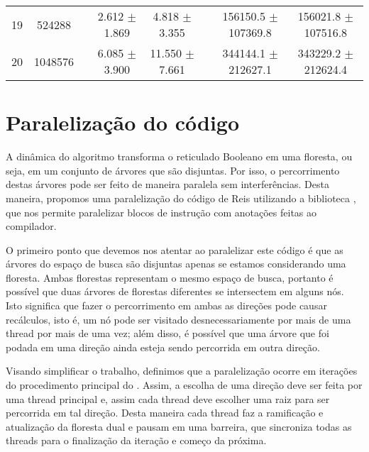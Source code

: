 \begin{table}
\begin{tabular}{cc c cc c cc}
19 &  524288 &&  2.612 $\pm$ 1.869 & 4.818 $\pm$ 3.355 &&  156150.5 $\pm$ 107369.8 & 156021.8 $\pm$ 107516.8 \\
20 & 1048576 &&  6.085 $\pm$ 3.900 & 11.550 $\pm$ 7.661 &&  344144.1 $\pm$ 212627.1 & 343229.2 $\pm$ 212624.4 \\
\bottomrule 
\end{tabular}%
\end{table}

\section{Paralelização do código}
A dinâmica do algoritmo  transforma o
reticulado Booleano em uma floresta, ou seja, em um conjunto de árvores
que são disjuntas. Por isso, o percorrimento destas árvores pode ser
feito de maneira paralela sem interferências. Desta maneira, propomos
uma paralelização do código de Reis utilizando a biblioteca 
, que nos permite paralelizar blocos de instrução
com anotações feitas ao compilador.

O primeiro ponto que devemos nos atentar ao paralelizar este código é
que as árvores do espaço de busca são disjuntas apenas se estamos 
considerando uma floresta. Ambas florestas representam o mesmo espaço de
busca, portanto é possível que duas árvores de florestas diferentes se 
intersectem em alguns nós. Isto significa que fazer o percorrimento em
ambas as direções pode causar recálculos, isto é, um nó pode ser 
visitado desnecessariamente por mais de uma thread por mais de uma vez;
além disso, é possível que uma árvore que foi podada em uma direção 
ainda esteja sendo percorrida em outra direção.

Visando simplificar o trabalho, definimos que a paralelização ocorre em
iterações do procedimento principal do . Assim, a escolha
de uma direção deve ser feita por uma thread principal e, assim cada
thread deve escolher uma raiz para ser percorrida em tal direção. Desta
maneira cada thread faz a ramificação e atualização da floresta dual
e pausam em uma barreira, que sincroniza todas as threads para o 
finalização da iteração e começo da próxima.

